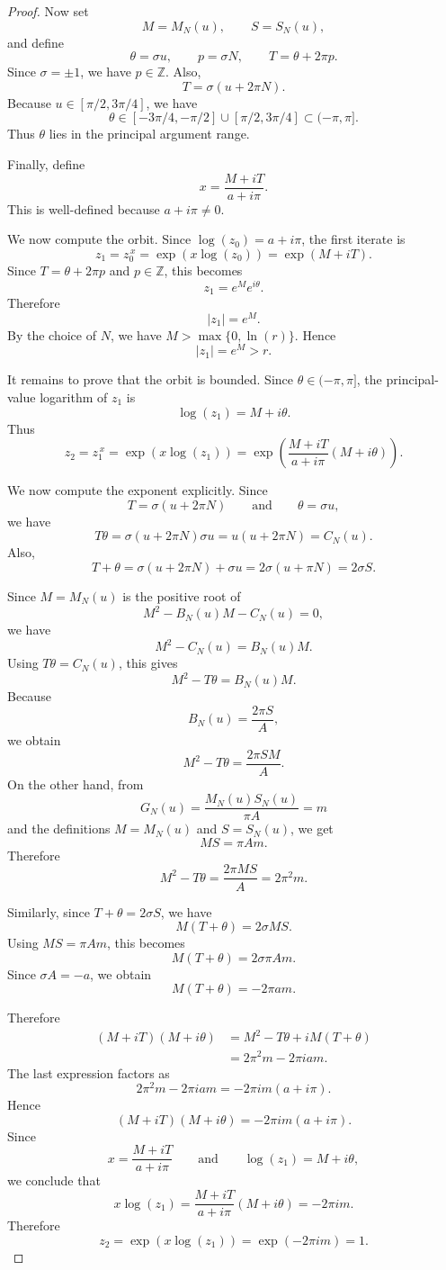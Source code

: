 \documentclass[12pt,a4paper]{amsart}
\theoremstyle{remark}
\newcommand{\Z}{\mathbb{Z}}
\begin{document}
\begin{proof}
Now set
\[
M=M_N(u),
\qquad
S=S_N(u),
\]
and define
\[
\theta=\sigma u,
\qquad
p=\sigma N,
\qquad
T=\theta+2\pi p.
\]
Since $\sigma=\pm 1$, we have $p\in\Z$. Also,
\[
T=\sigma(u+2\pi N).
\]
Because $u\in[\pi/2,3\pi/4]$, we have
\[
\theta\in[-3\pi/4,-\pi/2]\cup[\pi/2,3\pi/4]\subset(-\pi,\pi].
\]
Thus $\theta$ lies in the principal argument range.

Finally, define
\[
x=\frac{M+iT}{a+i\pi}.
\]
This is well-defined because $a+i\pi\ne 0$.

We now compute the orbit. Since $\log(z_0)=a+i\pi$, the first iterate is
\[
z_1
=
z_0^{\,x}
=
\exp(x\log(z_0))
=
\exp(M+iT).
\]
Since $T=\theta+2\pi p$ and $p\in\Z$, this becomes
\[
z_1=e^M e^{i\theta}.
\]
Therefore
\[
|z_1|=e^M.
\]
By the choice of $N$, we have $M>\max\{0,\ln(r)\}$. Hence
\[
|z_1|=e^M>r.
\]

It remains to prove that the orbit is bounded. Since $\theta\in(-\pi,\pi]$,
the principal-value logarithm of $z_1$ is
\[
\log(z_1)=M+i\theta.
\]
Thus
\[
z_2
=
z_1^{\,x}
=
\exp(x\log(z_1))
=
\exp\left(\frac{M+iT}{a+i\pi}(M+i\theta)\right).
\]

We now compute the exponent explicitly. Since
\[
T=\sigma(u+2\pi N)
\qquad\text{and}\qquad
\theta=\sigma u,
\]
we have
\[
T\theta
=
\sigma(u+2\pi N)\sigma u
=
u(u+2\pi N)
=
C_N(u).
\]
Also,
\[
T+\theta
=
\sigma(u+2\pi N)+\sigma u
=
2\sigma(u+\pi N)
=
2\sigma S.
\]

Since $M=M_N(u)$ is the positive root of
\[
M^2-B_N(u)M-C_N(u)=0,
\]
we have
\[
M^2-C_N(u)=B_N(u)M.
\]
Using $T\theta=C_N(u)$, this gives
\[
M^2-T\theta=B_N(u)M.
\]
Because
\[
B_N(u)=\frac{2\pi S}{A},
\]
we obtain
\[
M^2-T\theta
=
\frac{2\pi SM}{A}.
\]
On the other hand, from
\[
G_N(u)=\frac{M_N(u)S_N(u)}{\pi A}=m
\]
and the definitions $M=M_N(u)$ and $S=S_N(u)$, we get
\[
MS=\pi A m.
\]
Therefore
\[
M^2-T\theta
=
\frac{2\pi MS}{A}
=
2\pi^2m.
\]

Similarly, since $T+\theta=2\sigma S$, we have
\[
M(T+\theta)
=
2\sigma MS.
\]
Using $MS=\pi A m$, this becomes
\[
M(T+\theta)
=
2\sigma\pi A m.
\]
Since $\sigma A=-a$, we obtain
\[
M(T+\theta)
=
-2\pi a m.
\]

Therefore
\[
\begin{aligned}
(M+iT)(M+i\theta)
&=
M^2-T\theta+iM(T+\theta) \\
&=
2\pi^2m-2\pi i a m.
\end{aligned}
\]
The last expression factors as
\[
2\pi^2m-2\pi i a m
=
-2\pi i m(a+i\pi).
\]
Hence
\[
(M+iT)(M+i\theta)
=
-2\pi i m(a+i\pi).
\]
Since
\[
x=\frac{M+iT}{a+i\pi}
\qquad\text{and}\qquad
\log(z_1)=M+i\theta,
\]
we conclude that
\[
x\log(z_1)
=
\frac{M+iT}{a+i\pi}(M+i\theta)
=
-2\pi i m.
\]
Therefore
\[
z_2
=
\exp(x\log(z_1))
=
\exp(-2\pi i m)
=
1.
\]


\end{proof}
\end{document}
